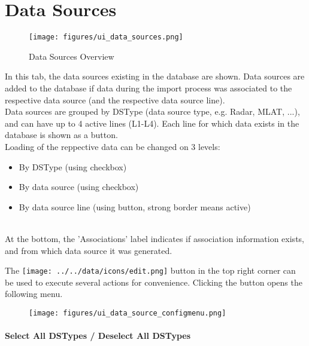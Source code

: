 
\section{Data Sources}
\label{sec:ui_data_sources}

\begin{figure}[H]
    \hspace*{-2.5cm}
    \texttt{[image: figures/ui\_data\_sources.png]}
  \caption{Data Sources Overview}
\end{figure}

In this tab, the data sources existing in the database are shown. Data sources are added to the database if data during the import process was associated to the respective data source (and the respective data source line). \\

Data sources are grouped by DSType (data source type, e.g. Radar, MLAT, ...), and can have up to 4 active lines (L1-L4). Each line for which data exists in the database is shown as a button. \\

Loading of the reppective data can be changed on 3 levels:

\begin{itemize}
 \item By DSType (using checkbox)
 \item By data source (using checkbox)
 \item By data source line (using button, strong border means active)
\end{itemize}
\  \\

At the bottom, the 'Associations' label indicates if association information exists, and from which data source it was generated.\newline

The \texttt{[image: ../../data/icons/edit.png]} button in the top right corner can be used to execute several actions for convenience.
Clicking the button opens the following menu.

\begin{figure}[H]
    \center
    \texttt{[image: figures/ui\_data\_source\_configmenu.png]}
\end{figure}

\paragraph{Select All DSTypes / Deselect All DSTypes}

